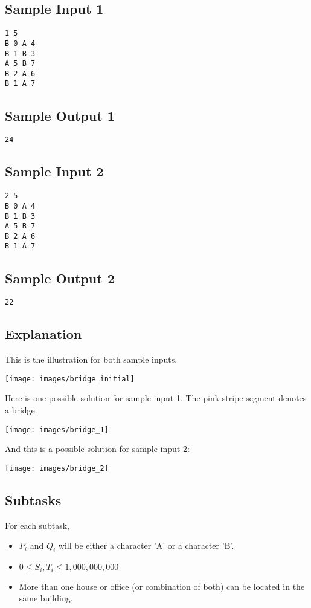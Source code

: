\documentclass{report}
\begin{document}
\subsection*{Sample Input 1}
\begin{verbatim}
1 5
B 0 A 4
B 1 B 3
A 5 B 7
B 2 A 6
B 1 A 7
\end{verbatim}

\subsection*{Sample Output 1}
\begin{verbatim}
24
\end{verbatim}

\subsection*{Sample Input 2}
\begin{verbatim}
2 5
B 0 A 4
B 1 B 3
A 5 B 7
B 2 A 6
B 1 A 7
\end{verbatim}

\subsection*{Sample Output 2}
\begin{verbatim}
22
\end{verbatim}

\subsection*{Explanation}
This is the illustration for both sample inputs.

\begin{center}
\texttt{[image: images/bridge\_initial]}
\end{center}

Here is one possible solution for sample input 1. The pink stripe segment denotes a bridge.

\begin{center}
\texttt{[image: images/bridge\_1]}
\end{center}

And this is a possible solution for sample input 2:

\begin{center}
\texttt{[image: images/bridge\_2]}
\end{center}
\subsection*{Subtasks}
For each subtask,
\begin{itemize} \parskip0pt \itemsep1pt
\item $P_i$ and $Q_i$ will be either a character 'A' or a character 'B'.
\item $0 \le S_i, T_i \le 1,000,000,000$
\item More than one house or office (or combination of both) can be located in the same building.
\end{itemize}
\end{document}
